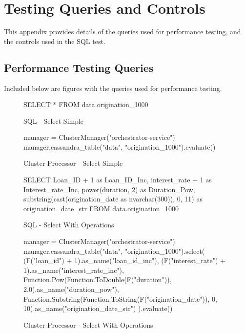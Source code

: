 
\chapter{Testing Queries and Controls}

This appendix provides details of the queries used for performance testing, and the controls used in the SQL test.

\section{Performance Testing Queries} \label{sec:testing-figs}

Included below are figures with the queries used for performance testing.

\begin{figure}[htp]
	\centering
	\begin{SQL}
SELECT * FROM data.origination_1000
	\end{SQL}
	\caption{SQL - Select Simple}
	\label{fig:sql-select-simple}
\end{figure}
	
\begin{figure}[htp]
	\begin{python}
manager = ClusterManager("orchestrator-service")
manager.cassandra_table("data", "origination_1000").evaluate()
	\end{python}
	\caption{Cluster Processor - Select Simple}
	\label{fig:cluster-select-simple}
\end{figure}

\begin{figure}[htp]
	\centering
	\begin{SQL}
SELECT 
Loan_ID + 1 as Loan_ID_Inc, 
interest_rate + 1 as Interest_rate_Inc, 
power(duration, 2) as Duration_Pow, 
substring(cast(origination_date as nvarchar(300)), 0, 11) as origination_date_str 
FROM data.origination_1000
	\end{SQL}
	\caption{SQL - Select With Operations}
	\label{fig:sql-select-complex}
\end{figure}

\begin{figure}[htp]
	\begin{python}
manager = ClusterManager("orchestrator-service")
manager.cassandra_table("data", "origination_1000").select(
(F("loan_id") + 1).as_name("loan_id_inc"), 
(F("interest_rate") + 1).as_name("interest_rate_inc"),
Function.Pow(Function.ToDouble(F("duration")), 2.0).as_name("duration_pow"),
Function.Substring(Function.ToString(F("origination_date")), 0, 10).as_name("origination_date_str")
).evaluate()
	\end{python}
	\caption{Cluster Processor - Select With Operations}
	\label{fig:cluster-select-complex}
\end{figure}


